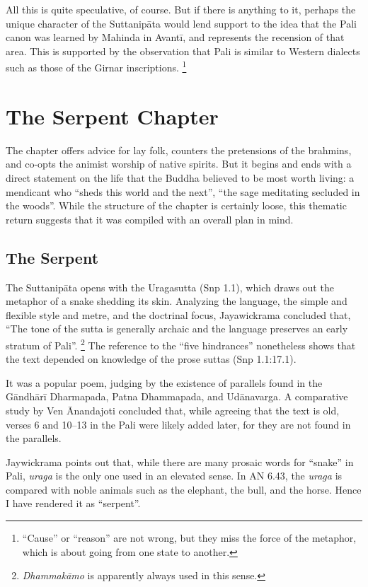 \documentclass[12pt,openany]{book}%
\begin{document}
All this is quite speculative, of course. But if there is anything to it, perhaps the unique character of the \textsanskrit{Suttanipāta} would lend support to the idea that the Pali canon was learned by Mahinda in \textsanskrit{Avantī}, and represents the recension of that area. This is supported by the observation that Pali is similar to Western dialects such as those of the Girnar inscriptions. \footnote{“Cause” or “reason” are not wrong, but they miss the force of the metaphor, which is about going from one state to another. }

\section*{The Serpent Chapter}

The chapter offers advice for lay folk, counters the pretensions of the brahmins, and co-opts the animist worship of native spirits. But it begins and ends with a direct statement on the life that the Buddha believed to be most worth living: a mendicant who “sheds this world and the next”, “the sage meditating secluded in the woods”. While the structure of the chapter is certainly loose, this thematic return suggests that it was compiled with an overall plan in mind.

\subsection*{The Serpent}

The \textsanskrit{Suttanipāta} opens with the Uragasutta (Snp 1.1), which draws out the metaphor of a snake shedding its skin. Analyzing the language, the simple and flexible style and metre, and the doctrinal focus, Jayawickrama concluded that, “The tone of the sutta is generally archaic and the language preserves an early stratum of Pali”. \footnote{\textit{\textsanskrit{Dhammakāmo}} is apparently always used in this sense. } The reference to the “five hindrances” nonetheless shows that the text depended on knowledge of the prose suttas (Snp 1.1:17.1).

It was a popular poem, judging by the existence of parallels found in the \textsanskrit{Gāndhārī} Dharmapada, Patna Dhammapada, and \textsanskrit{Udānavarga}. A comparative study by Ven Ānandajoti concluded that, while agreeing that the text is old, verses 6 and 10–13 in the Pali were likely added later, for they are not found in the parallels.

Jaywickrama points out that, while there are many prosaic words for “snake” in Pali, \textit{uraga} is the only one used in an elevated sense. In AN 6.43, the \textit{uraga} is compared with noble animals such as the elephant, the bull, and the horse. Hence I have rendered it as “serpent”.
\end{document}
